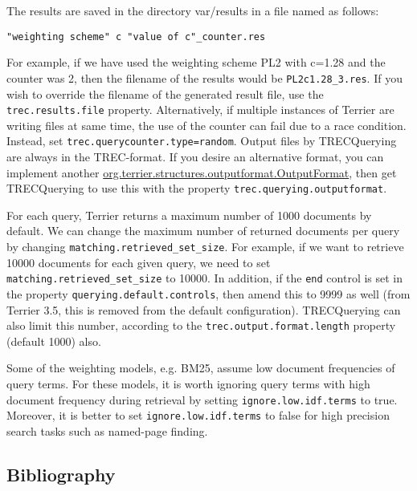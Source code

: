 The results are saved in the directory var/results in a file named as
follows:

\begin{verbatim}
"weighting scheme" c "value of c"_counter.res
\end{verbatim}

For example, if we have used the weighting scheme PL2 with c=1.28 and
the counter was 2, then the filename of the results would be
\texttt{PL2c1.28\_3.res}. If you wish to override the filename of the
generated result file, use the \texttt{trec.results.file} property.
Alternatively, if multiple instances of Terrier are writing files at
same time, the use of the counter can fail due to a race condition.
Instead, set \texttt{trec.querycounter.type=random}. Output files by
TRECQuerying are always in the TREC-format. If you desire an alternative
format, you can implement another
\href{javadoc/org/terrier/structures/outputformat/OutputFormat.html}{org.terrier.structures.outputformat.OutputFormat},
then get TRECQuerying to use this with the property
\texttt{trec.querying.outputformat}.

For each query, Terrier returns a maximum number of 1000 documents by
default. We can change the maximum number of returned documents per
query by changing \texttt{matching.retrieved\_set\_size}. For example,
if we want to retrieve 10000 documents for each given query, we need to
set \texttt{matching.retrieved\_set\_size} to 10000. In addition, if the
\texttt{end} control is set in the property
\texttt{querying.default.controls}, then amend this to 9999 as well
(from Terrier 3.5, this is removed from the default configuration).
TRECQuerying can also limit this number, according to the
\texttt{trec.output.format.length} property (default 1000) also.

Some of the weighting models, e.g. BM25, assume low document frequencies
of query terms. For these models, it is worth ignoring query terms with
high document frequency during retrieval by setting
\texttt{ignore.low.idf.terms} to true. Moreover, it is better to set
\texttt{ignore.low.idf.terms} to false for high precision search tasks
such as named-page finding.

\subsection{Bibliography}\label{bibliography}

